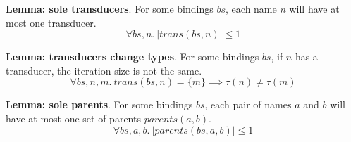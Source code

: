 \textbf{Lemma: sole transducers}.
For some bindings $bs$, each name $n$ will have at most one transducer.
\[
\forall bs, n.\ |trans(bs, n)| \le 1
\]

\textbf{Lemma: transducers change types}.
For some bindings $bs$, if $n$ has a transducer, the iteration size is not the same.
\[
\forall bs, n, m.\ trans(bs, n) = \{m\} \implies \tau(n) \not= \tau(m)
\]

\textbf{Lemma: sole parents}.
For some bindings $bs$, each pair of names $a$ and $b$ will have at most one set of parents $parents(a,b)$.
\[
\forall bs, a, b.\ |parents(bs, a, b)| \le 1
\]

